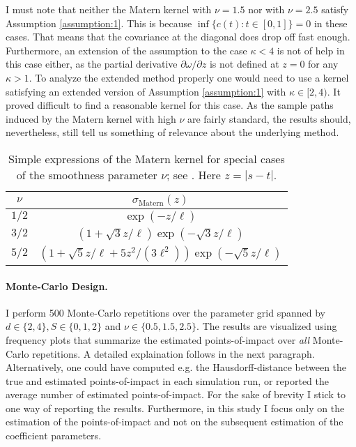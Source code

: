 \smallskip

\begin{remark}
I must note that neither the Matern kernel with $\nu = 1.5$ nor with $\nu = 2.5$ satisfy
Assumption \ref{assumption:1}. This is because $\inf \{ c(t) : t \in [0, 1] \} = 0$ in
these cases. That means that the covariance at the diagonal does drop off fast enough.
Furthermore, an extension of the assumption to the case $\kappa < 4$ is not of help in
this case either, as the partial derivative $\partial \omega / \partial z$ is not
defined at $z = 0$ for any $\kappa > 1$. To analyze the extended method properly one
would need to use a kernel satisfying an extended version of Assumption
\ref{assumption:1} with $\kappa \in [2, 4)$. It proved difficult to find a reasonable
kernel for this case. As the sample paths induced by the Matern kernel with high $\nu$
are fairly standard, the results should, nevertheless, still tell us something of
relevance about the underlying method.
\end{remark}


\begin{table}
    \renewcommand{\arraystretch}{2}
    \centering
    \begin{tabular}{c|c}
        $\nu$ & $\sigma_{\text{Matern}}(z)$ \\ \hline
        $1/2$ & $\exp \left( - z / \ell \right)$\\
        $3/2$ & $\left(1 + \sqrt{3} z / \ell \right)\exp \left( - \sqrt{3}z / \ell \right)$\\
        $5/2$ & $\left(1 + \sqrt{5} z / \ell + 5z^2 / (3\ell^2) \right)\exp \left( -
        \sqrt{5}z / \ell \right)$
    \end{tabular}
    \caption{Simple expressions of the Matern kernel for special cases of the smoothness
    parameter $\nu$; see \cite{Rasmussen2006}. Here $z = |s - t|$.}
    \label{table:matern_kernel}
\end{table}



\paragraph{Monte-Carlo Design.}

I perform 500 Monte-Carlo repetitions over the parameter grid spanned by $d \in \{2, 4\},
S \in \{0, 1, 2\}$ and $\nu \in \{0.5, 1.5, 2.5\}$. The results are visualized using
frequency plots that summarize the estimated points-of-impact over \emph{all}
Monte-Carlo repetitions. A detailed explaination follows in the next paragraph.
Alternatively, one could have computed e.g. the Hausdorff-distance between the true and
estimated points-of-impact in each simulation run, or reported the average number of
estimated points-of-impact. For the sake of brevity I stick to one way of reporting the
results. Furthermore, in this study I focus only on the estimation of the
points-of-impact and not on the subsequent estimation of the coefficient parameters.


